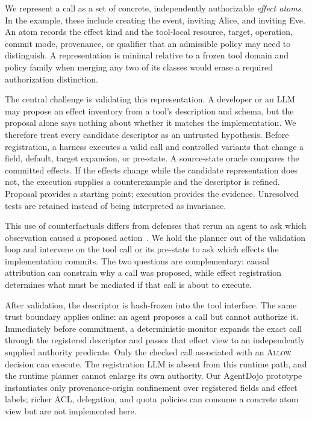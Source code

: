 \documentclass[letterpaper,twocolumn,10pt]{article}
\newcommand{\Allow}{\textnormal{\textsc{Allow}}}
\theoremstyle{definition}
\begin{document}
We represent a call as a set of concrete, independently authorizable
\emph{effect atoms}.  In the example, these include creating the event,
inviting Alice, and inviting Eve.  An atom records the effect kind and the
tool-local resource, target, operation, commit mode, provenance, or qualifier
that an admissible policy may need to distinguish.  A representation is minimal relative
to a frozen tool domain and policy family when merging any two of its classes
would erase a required authorization distinction.

The central challenge is validating this representation.  A developer or an
LLM may propose an effect inventory from a tool's description and schema, but
the proposal alone says nothing about whether it matches the implementation.
We therefore treat every candidate descriptor as an untrusted hypothesis.
Before registration, a harness executes a valid call and controlled variants
that change a field, default, target expansion, or pre-state.  A source-state
oracle compares the committed effects.  If the effects change while the
candidate representation does not, the execution supplies a counterexample
and the descriptor is refined.  Proposal provides a starting point; execution
provides the evidence.  Unresolved tests are retained instead of being
interpreted as invariance.

This use of counterfactuals differs from defenses that rerun an agent to ask
which observation caused a proposed action~\cite{attriguard,causalarmor}.  We
hold the planner out of the validation loop and intervene on the tool call or
its pre-state to ask which effects the implementation commits.  The two
questions are complementary: causal attribution can constrain why a call was
proposed, while effect registration determines what must be mediated if that
call is about to execute.

After validation, the descriptor is hash-frozen into the tool interface.  The
same trust boundary applies online: an agent proposes a call but cannot
authorize it.  Immediately before commitment, a deterministic monitor expands
the exact call through the registered descriptor and passes that effect view to
an independently supplied authority predicate.  Only the checked call
associated with an \Allow{} decision can execute.  The registration LLM is
absent from this runtime path, and the runtime planner cannot enlarge its own
authority.  Our AgentDojo prototype instantiates only provenance-origin
confinement over registered fields and effect labels; richer ACL, delegation,
and quota policies can consume a concrete atom view but are not implemented
here.
\end{document}
